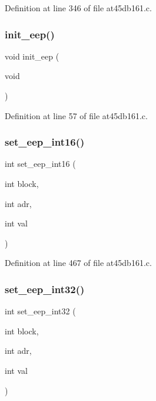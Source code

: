 Definition at line 346 of file at45db161.\+c.

\mbox{\label{at45db161_8c_a478a6580f60a54fc5facbaf561d73f8b}} 
\subsubsection{init\+\_\+eep()}
{\footnotesize\ttfamily void init\+\_\+eep (\begin{DoxyParamCaption}\item[{void}]{ }\end{DoxyParamCaption})}



Definition at line 57 of file at45db161.\+c.

\mbox{\label{at45db161_8c_a7e5b29d34660df457749c45ff7835587}} 
\subsubsection{set\+\_\+eep\+\_\+int16()}
{\footnotesize\ttfamily int set\+\_\+eep\+\_\+int16 (\begin{DoxyParamCaption}\item[{int}]{block,  }\item[{int}]{adr,  }\item[{int}]{val }\end{DoxyParamCaption})}



Definition at line 467 of file at45db161.\+c.

\mbox{\label{at45db161_8c_abedbeb274ffcf0687eef47099b77815d}} 
\subsubsection{set\+\_\+eep\+\_\+int32()}
{\footnotesize\ttfamily int set\+\_\+eep\+\_\+int32 (\begin{DoxyParamCaption}\item[{int}]{block,  }\item[{int}]{adr,  }\item[{int}]{val }\end{DoxyParamCaption})}



